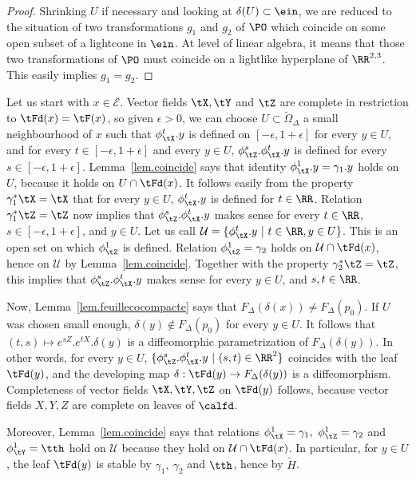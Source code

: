 \begin{proof}
Shrinking $U$ if necessary and looking at $\delta(U) \subset \ein$, we are reduced to the situation of two transformations $g_1$ and $g_2$ of $\PO$ which coincide on some open subset of a lightcone in $\ein$. At level of linear algebra, it means that those two transformations of $\PO$ must coincide on a lightlike hyperplane of $\RR^{2,3}$. This easily implies $g_1=g_2$.
\end{proof}


Let us start with $x \in \mathcal{E}$. Vector fields $\tX,\tY$ and $\tZ$ are complete in restriction to $\tFd(x)=\tF(x)$, so given $\epsilon >0$, we can choose $U \subset \tilde{\Omega}_{\Delta}$ a small neighbourhood of $x$ such that $\phi_{\tX}^t.y$ is defined on $[-\epsilon, 1+\epsilon]$ for every $y \in U$, and for every $t \in [- \epsilon, 1+\epsilon]$ and every $y \in U$, $\phi_{\tZ}^s.\phi_{\tX}^t.y$ is defined for every $s \in [-\epsilon, 1+ \epsilon]$. Lemma~\ref{lem.coincide} says that identity $\phi_{\tX}^1.y=\gamma_1.y$ holds on $U$, because it holds on $U \cap \tFd(x)$. It follows easily from the property $\gamma_1^*\tX=\tX$ that for every $y \in U$, $\phi_{\tX}^t.y$ is defined for $t \in \RR$. Relation $\gamma_1^*\tZ=\tZ$ now implies that $\phi_{\tZ}^s.\phi_{\tX}^t.y$ makes sense for every $t \in \RR$, $s \in [- \epsilon, 1+\epsilon]$, and $y \in U$. Let us call $\mathcal{U}=\{ \phi_{\tX}^t.y \ | \ t \in \RR, y \in U\}$. This is an open set on which $\phi_{\tZ}^1$ is defined. Relation $\phi_{\tZ}^1=\gamma_2$ holds on ${\mathcal U} \cap \tFd(x)$, hence on ${\mathcal U}$ by Lemma~\ref{lem.coincide}. Together with the property $\gamma_2^* \tZ=\tZ$, this implies that $\phi_{\tZ}^s.\phi_{\tX}^t.y$ makes sense for every $y \in U$, and $s,t \in \RR$.

Now, Lemma~\ref{lem.feuillecocompacte} says that $F_{\Delta}(\delta(x))\not = F_{\Delta}(p_0)$. If $U$ was chosen small enough, $\delta(y) \not \in F_{\Delta}(p_0)$ for every $y \in U$. It follows that $(t,s) \mapsto e^{sZ}.e^{tX}.\delta(y)$ is a diffeomorphic parametrization of $F_{\Delta}(\delta(y))$. In other words, for every $y \in U$, $\{ \phi_{\tZ}^s.\phi_{\tX}^t.y \ | \ (s,t) \in \RR^2 \}$ coincides with the leaf $\tFd(y)$, and the developing map $\delta: \tFd(y) \to F_{\Delta}(\delta(y))$ is a diffeomorphism. Completeness of vector fields $\tX,\tY,\tZ$ on $\tFd(y)$ follows, because vector fields $X,Y,Z$ are complete on leaves of $\calfd$.

Moreover, Lemma~\ref{lem.coincide} says that relations $\phi_{\tX}^1=\gamma_1, \ \phi_{\tZ}^1=\gamma_2$ and $\phi_{\tY}^1=\tth$ hold on ${\mathcal U}$ because they hold on $\mathcal{U} \cap \tFd(x)$. In particular, for $y \in U$, the leaf $\tFd(y)$ is stable by $\gamma_1, \ \gamma_2$ and $\tth$, hence by $\tilde{H}$.


